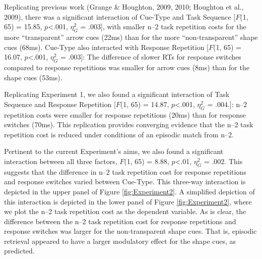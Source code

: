 \documentclass[a4paper, doc, natbib]{apa6}
\begin{document}
Replicating previous work (Grange \& Houghton, 2009, 2010; Houghton et al., 2009), there was a significant interaction of Cue-Type and Task Sequence [$F$(1, 65) = 15.85, $p$<.001, $\eta_G^2$ = .003], with smaller n--2 task repetition costs for the more ``transparent'' arrow cues (22ms) than for the more ``non-transparent'' shape cues (68ms). Cue-Type also interacted with Response Repetition [$F$(1, 65) = 16.07, $p$<.001, $\eta_G^2$ = .003]: The difference of slower RTs for response switches compared to response repetitions was smaller for arrow cues (8ms) than for the shape cues (53ms).

Replicating Experiment 1, we also found a significant interaction of Task Sequence and Response Repetition [$F$(1, 65) = 14.87, $p$<.001, $\eta_G^2$ = .004.]: n--2 repetition costs were smaller for response repetitions (20ms) than for response switches (70ms). This replication provides converging evidence that the n--2 task repetition cost is reduced under conditions of an episodic match from n--2. 

Pertinent to the current Experiment's aims, we also found a significant interaction between all three factors, $F$(1, 65) = 8.88, $p$<.01, $\eta_G^2$ = .002. This suggests that the difference in n--2 task repetition cost for response repetitions and response switches varied between Cue-Type. This three-way interaction is depicted in the upper panel of Figure \ref{fig:Experiment2}. A simplified depiction of this interaction is depicted in the lower panel of Figure \ref{fig:Experiment2}, where we plot the n--2 task repetition cost as the dependent variable. As is clear, the difference between the n--2 task repetition cost for response repetitions and response switches was larger for the non-transparent shape cues. That is, episodic retrieval appeared to have a larger modulatory effect for the shape cues, as predicted.   
\end{document}

